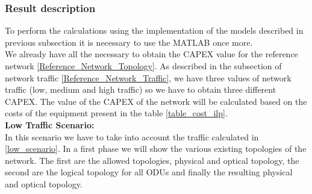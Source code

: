 \newpage
\subsubsection{Result description}

To perform the calculations using the implementation of the models described in previous subsection it is necessary to use the MATLAB once more. \\
We already have all the necessary to obtain the CAPEX value for the reference network \ref{Reference_Network_Topology}. As described in the subsection of network traffic \ref{Reference_Network_Traffic}, we have three values of network traffic (low, medium and high traffic) so we have to obtain three different CAPEX.
The value of the CAPEX of the network will be calculated based on the costs of the equipment present in the table \ref{table_cost_ilp}.\\

\vspace{15pt}
\textbf{Low Traffic Scenario:}\\

In this scenario we have to take into account the traffic calculated in \ref{low_scenario}. In a first phase we will show the various existing topologies of the network. The first are the allowed topologies, physical and optical topology, the second are the logical topology for all ODUs and finally the resulting physical and optical topology.\\

